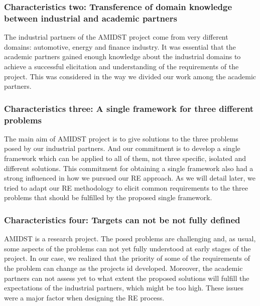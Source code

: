 \documentclass[11pt, oneside]{article}   	%
\begin{document}


\subsubsection*{Characteristics two: Transference of domain knowledge between industrial and academic partners}
\label{sec:characteristic2}

The industrial partners of the AMIDST project come from very different domains: automotive, energy and finance industry.  It was essential that the academic partners gained enough knowledge about the industrial domains to achieve a successful elicitation and understanding of the requirements of the project. This was considered in the way we divided our work among the academic partners. 

\subsubsection*{Characteristics three:  A single framework for three different problems}
\label{sec:characteristic3}

The main aim of AMIDST project is to give solutions to the three problems posed  by our industrial partners. And our commitment is to develop a single framework which can be applied to all of them, not three specific, isolated and different solutions. This commitment for obtaining a single framework also had a strong influenced in how we pursued our RE approach. As we will detail later, we tried to adapt our RE methodology to elicit common requirements to the three problems that should be fulfilled by the proposed single framework. 

\subsubsection*{Characteristics four: Targets can not be not fully defined}
\label{sec:characteristic4}

AMIDST is a research project. The posed problems are challenging and, as usual, some aspects of the problems can not yet fully understood at early stages of the project. In our case, we realized that the priority of some of the requirements of the problem can change as the projects id developed. Moreover, the academic partners can not assess yet to what extent the proposed  solutions will fulfill the expectations of the industrial partners, which might be too high. These issues were  a major factor when designing the RE process.
\end{document}
